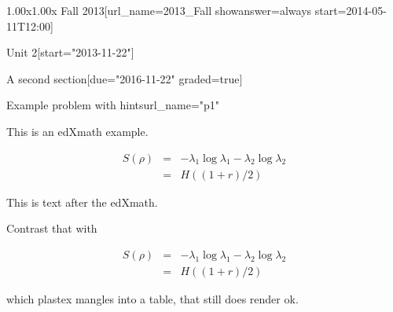 \documentclass[12pt]{article}
\begin{document}
\begin{edXcourse}{1.00x}{1.00x Fall 2013}[url_name=2013_Fall showanswer=always start=2014-05-11T12:00]
\begin{edXchapter}{Unit 2}[start="2013-11-22"]
\begin{edXsection}{A second section}[due="2016-11-22" graded=true]

\begin{edXproblem}{Example problem with hints}{url_name="p1"}
 
This is an edXmath example.

\begin{edXmath}
\begin{eqnarray}
S(\rho) &=&  -\lambda_{1} \log \lambda_{1} -\lambda_{2} \log \lambda_{2} \\
        &=&  H((1+r)/2)
\end{eqnarray}
\end{edXmath}

This is text after the edXmath.

Contrast that with

\begin{eqnarray}
S(\rho) &=&  -\lambda_{1} \log \lambda_{1} -\lambda_{2} \log \lambda_{2} \\
        &=&  H((1+r)/2)
\end{eqnarray}

which plastex mangles into a table, that still does render ok.

\end{edXproblem}


\end{edXsection}
\end{edXchapter}
\end{edXcourse}

\end{document}
